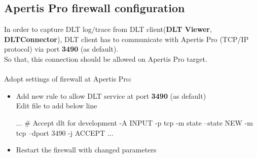 \subsection{Apertis Pro firewall configuration}
In order to capture DLT log/trace from DLT client(\textbf{DLT Viewer},
\textbf{DLTConnector}), DLT client has to communicate with Apertis Pro
(TCP/IP protocol) via port \textbf{3490} (as default).\\
So that, this connection should be allowed on Apertis Pro target.\\
\\
Adopt settings of firewall at Apertis Pro:
\begin{itemize}
   \item Add new rule to allow DLT service at port \textbf{3490} (as default)\\
   Edit  file to add below line
   \begin{robotcode}
...
# Accept dlt for development
-A INPUT -p tcp -m state --state NEW -m tcp --dport 3490 -j ACCEPT
...
   \end{robotcode}

   \item Restart the firewall with changed parameters\\
\end{itemize}

